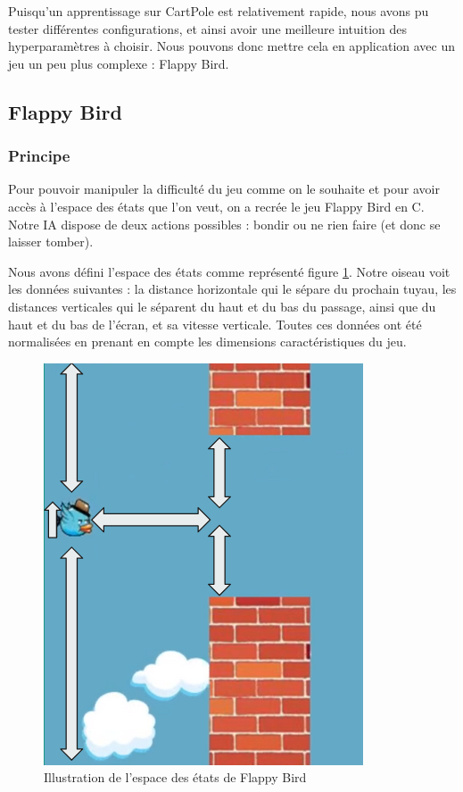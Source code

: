 Puisqu'un apprentissage sur CartPole est relativement rapide, nous avons pu tester différentes configurations, et ainsi avoir une meilleure intuition des hyperparamètres
à choisir. Nous pouvons donc mettre cela en application avec un jeu un peu plus complexe : Flappy Bird.


\subsection{Flappy Bird}

\subsubsection{Principe}

Pour pouvoir manipuler la difficulté du jeu comme on le souhaite et pour avoir accès à l'espace des états que l'on veut, on a recrée le jeu Flappy Bird en C.
Notre IA dispose de deux actions possibles : bondir ou ne rien faire (et donc se laisser tomber).

Nous avons défini l'espace des états comme représenté figure \ref{fig:flappy-states}. Notre oiseau voit les données suivantes : la distance horizontale qui le sépare 
du prochain tuyau, les distances verticales qui le séparent du haut et du bas du passage, ainsi que du haut et du bas de l'écran, et sa vitesse verticale.
Toutes ces données ont été normalisées en prenant en compte les dimensions caractéristiques du jeu. 

\begin{figure}[h]
 \centering
 \includegraphics[scale = 0.3]{img/flappy_state.png}
 \caption{Illustration de l'espace des états de Flappy Bird}
 \label{fig:flappy-states}
\end{figure}

